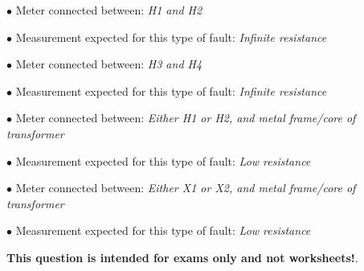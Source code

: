 





\noindent
{}

\vskip 5pt
\item{$\bullet$} Meter connected between: {\it H1 and H2}
\vskip 5pt
\item{$\bullet$} Measurement expected for this type of fault: {\it Infinite resistance}

\vskip 30pt

\noindent
{}

\vskip 5pt
\item{$\bullet$} Meter connected between: {\it H3 and H4}
\vskip 5pt
\item{$\bullet$} Measurement expected for this type of fault: {\it Infinite resistance}

\vskip 30pt

\noindent
{}

\vskip 5pt
\item{$\bullet$} Meter connected between: {\it Either H1 or H2, and metal frame/core of transformer}
\vskip 5pt
\item{$\bullet$} Measurement expected for this type of fault: {\it Low resistance}

\vskip 30pt

\noindent
{}

\vskip 5pt
\item{$\bullet$} Meter connected between: {\it Either X1 or X2, and metal frame/core of transformer}
\vskip 5pt
\item{$\bullet$} Measurement expected for this type of fault: {\it Low resistance}







{\bf This question is intended for exams only and not worksheets!}.



